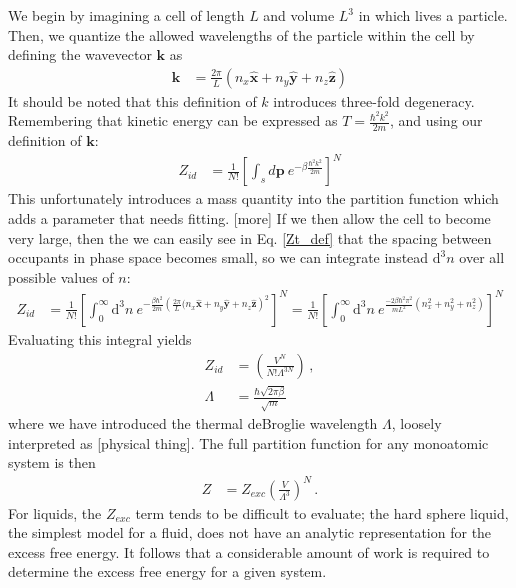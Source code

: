 \documentclass[12pt]{article}
\newcommand*{\diff}{\mathrm{d}}
\begin{document}
We begin by imagining a cell of length $L$ and volume $L^3$ in which lives a particle. Then, we quantize the allowed wavelengths of the particle within the cell by defining the wavevector $\mathbf{k}$ as
\begin{align}
    \mathbf{k} &= \frac{2\pi}{L}(n_x\mathbf{\hat{x}} + n_y\mathbf{\hat{y}} + n_z\mathbf{\hat{z}})
\end{align}
It should be noted that this definition of $k$ introduces three-fold degeneracy.\\
Remembering that kinetic energy can be expressed as $T = \frac{\hbar^2 k^2}{2m}$, and using our definition of $\mathbf{k}$:
\begin{align}
    Z_{id} &= \frac{1}{N!}\left[\int_s d\mathbf{p} ~e^{-\beta \frac{\hbar^2 k^2}{2m}}\right]^{N}
    \label{Zt_def}
\end{align}
This unfortunately introduces a mass quantity into the partition function which adds a parameter that needs fitting. [more] 
If we then allow the cell to become very large, then the we can easily see in Eq. \ref{Zt_def} that the spacing between occupants in phase space becomes small, so we can integrate instead $\diff ^3 n$ over all possible values of $n$:
\begin{align}
    Z_{id} &= \frac{1}{N!}\left[\int_0^\infty \diff^3 n ~e^{-\frac{\beta \hbar^2}{2m} \left(\frac{2\pi}{L}(n_x\mathbf{\hat{x}} + n_y\mathbf{\hat{y}} + n_z\mathbf{\hat{z}}\right)^2}\right]^{N} = \frac{1}{N!}\left[\int_0^\infty \diff^3 n ~e^{ \frac{-2\beta \hbar^2\pi^2}{mL^2}(n_x^2 + n_y^2 + n_z^2)}\right]^{N}
\end{align}
Evaluating this integral yields
\begin{align}
    Z_{id} &= \left(\frac{V^N}{N!\Lambda^{3N}}\right) \,, \\
    \Lambda &= \frac{\hbar\sqrt{2\pi\beta}}{\sqrt{m}}
\end{align}
where we have introduced the thermal deBroglie wavelength $\Lambda$, loosely interpreted as [physical thing]. The full partition function for any monoatomic system is then
\begin{align}
    Z &= Z_{exc} \left(\frac{V}{\Lambda^{3}}\right)^{N} \,.
\end{align}
For liquids, the $Z_{exc}$ term tends to be difficult to evaluate; the hard sphere liquid, the simplest model for a fluid, does not have an analytic representation for the excess free energy. It follows that a considerable amount of work is required to determine the excess free energy for a given system. 
\end{document}
